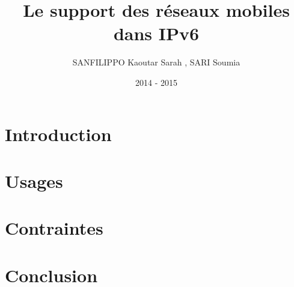 \documentclass[a4paper]{article}
\title{Le support des r\'{e}seaux mobiles dans IPv6}
\author{SANFILIPPO Kaoutar Sarah , SARI Soumia}
\date{2014 - 2015}
\begin{document}
\maketitle
\newpage 
\renewcommand{\contentsname}{Sommaire}
\tableofcontents


\section{Introduction}
\section{Usages}
\section{Contraintes}
\section{Conclusion}
\end{document}
